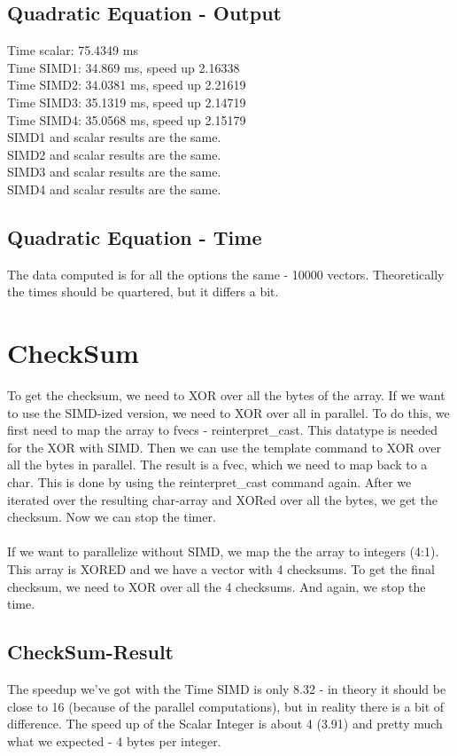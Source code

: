 \documentclass{article}
\begin{document}
\subsection{Quadratic Equation - Output}
Time scalar: 75.4349 ms\\
Time SIMD1:    34.869 ms, speed up 2.16338\\
Time SIMD2:    34.0381 ms, speed up 2.21619\\
Time SIMD3:    35.1319 ms, speed up 2.14719\\
Time SIMD4:    35.0568 ms, speed up 2.15179\\
SIMD1 and scalar results are the same.\\
SIMD2 and scalar results are the same.\\
SIMD3 and scalar results are the same.\\
SIMD4 and scalar results are the same.\\

\subsection{Quadratic Equation - Time}
The data computed is for all the options the
same - 10000 vectors. Theoretically the times
should be quartered, but it differs a bit.



\section{CheckSum}
To get the checksum, we need to XOR over all the bytes of the array. If we want to use 
the SIMD-ized version, we need to XOR over all in parallel.
To do this, we first need to map the array to fvecs - reinterpret\_cast. This datatype is needed 
for the XOR with SIMD.
Then we can use the template command to XOR over all the bytes in parallel.
The result is a fvec, which we need to map back to a char. This is done by using the
reinterpret\_cast command again. After we iterated over the resulting char-array
and XORed over all the bytes, we get the checksum. Now we can stop the timer.
\\\\
If we want to parallelize without SIMD,
we map the the array to integers (4:1). This array
is XORED and we have a vector with 4 checksums.
To get the final checksum, we need to XOR over all the 4 checksums.
And again, we stop the time.
\subsection{CheckSum-Result}
The speedup we've got with the Time SIMD is only 8.32 - in
theory it should be close to 16 (because of the parallel 
computations), but in reality there is a bit of difference.
The speed up of the Scalar Integer is about 4 (3.91) and 
pretty much what we expected - 4 bytes per integer.
\end{document}
